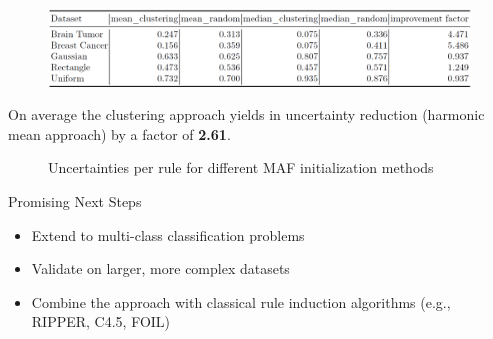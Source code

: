 \documentclass[aspectratio=169]{beamer}
\begin{document}
\begin{frame}
\begin{figure}
    \centering
    \includegraphics[width=1\linewidth]{../../fig/score_df.png}
\end{figure}
On average the clustering approach yields in uncertainty reduction (harmonic mean approach) by a factor of \textbf{2.61}.
\end{frame}

\begin{frame}
\begin{figure}
    \caption{Uncertainties per rule for different MAF initialization methods}
    \label{fig:bars_uncertainty}
\end{figure}
\end{frame}

\begin{frame}{Promising Next Steps}
    \begin{itemize}
        \item Extend to multi-class classification problems
        \item Validate on larger, more complex datasets
        \item Combine the approach with classical rule induction algorithms (e.g., RIPPER, C4.5, FOIL)
    \end{itemize}
\end{frame}
\end{document}
